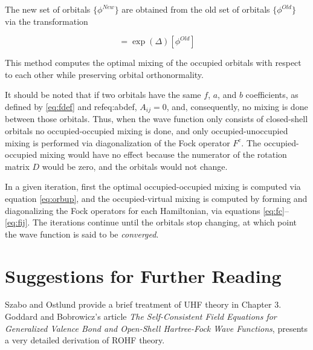 \noindent The new set of orbitals $\{\phi^{New}\}$ are obtained from
the old set of orbitals $\{\phi^{Old}\}$ via the transformation

\begin{equation}
  [\phi^{New}] = \exp(\Delta)[\phi^{Old}]
\label{eq:orbup}
\end{equation}

This method computes the optimal mixing of the occupied orbitals with
respect to each other while preserving orbital orthonormality. 

It should be noted that if two orbitals have the same $f$, $a$, and
$b$ coefficients, as defined by \ref{eq:fdef} and ref{eq:abdef},
$A_{ij} = 0$, and, consequently, no mixing is done between those
orbitals. Thus, when the wave function only
consists of closed-shell orbitals no occupied-occupied mixing is done,
and only occupied-unoccupied mixing is performed via diagonalization
of the Fock operator $F^c$. The occupied-occupied mixing would have no
effect because the numerator of the rotation matrix $D$ would be zero,
and the orbitals would not change.

In a given iteration, first the optimal
occupied-occupied mixing is computed via equation \ref{eq:orbup}, and
the occupied-virtual mixing is computed by forming and diagonalizing
the Fock operators for each Hamiltonian, via equations
\ref{eq:fc}--\ref{eq:fij}. The iterations continue until the orbitals
stop changing, at which point the wave function is said to be
\emph{converged}.

\section{Suggestions for Further Reading}
Szabo and Ostlund \cite{Szabo82} provide a brief treatment of UHF
theory in Chapter 3. Goddard and Bobrowicz's article
\emph{The Self-Consistent Field Equations for Generalized Valence Bond
and Open-Shell Hartree-Fock Wave Functions}\cite{Bobrowicz77},
presents a very detailed derivation of ROHF theory.
